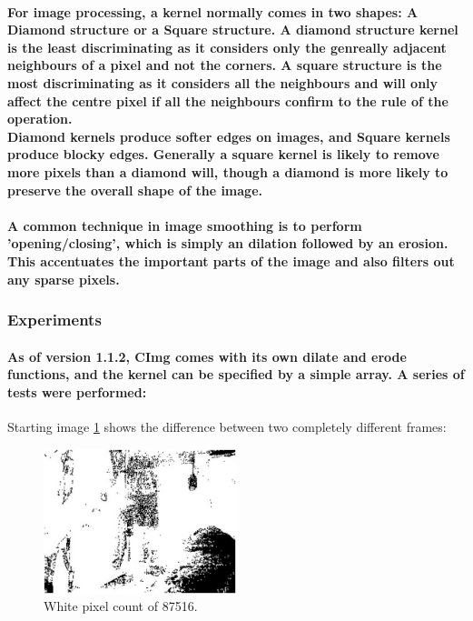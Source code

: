 \paragraph{For  image processing, a kernel normally comes in two shapes: A Diamond structure or a Square structure. A diamond structure kernel is the least discriminating as it considers only the genreally adjacent neighbours of a pixel and not the corners. A square structure  is the most discriminating as it considers all the neighbours and will only affect the centre pixel if all the neighbours confirm to the rule of the operation.
\\
Diamond kernels produce softer edges on images, and Square kernels produce blocky edges. Generally a square kernel is likely to remove more pixels than a diamond will, though a diamond is more likely to preserve the overall shape of the image.
}
\paragraph{A common technique in image smoothing is to perform 'opening/closing', which is simply an dilation followed by an erosion. This accentuates the important parts of the image and also filters out any sparse pixels.}

\subsubsection{Experiments}
\paragraph{As of version 1.1.2, CImg comes with its own dilate and erode functions, and the kernel can be specified by a simple array. A series of tests were performed:
}
Starting image \cref{img:uneditsub1} shows the difference between two  completely different frames:
\begin{figure}[H]
	\hspace{0.24\textwidth}
	\includegraphics[width=0.5\textwidth]{../images/ImageOps/uneditedsub}
	\caption{White pixel count of 87516.}
	\label{img:uneditsub1}
\end{figure}

